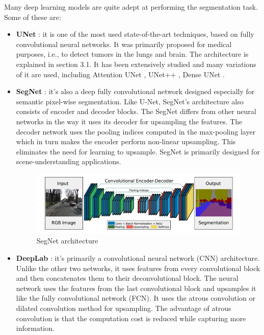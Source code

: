 Many deep learning models are quite adept at performing the segmentation task. Some of these are:
\begin{itemize}
    \item \textbf{UNet} \cite{ronneberger2015u}: it is one of the most used state-of-the-art techniques, based on fully convolutional neural networks. It was primarily proposed for medical purposes, i.e., to detect tumors in the lungs and brain. The architecture is explained in section 3.1. It has been extensively studied and many variations of it are used, including Attention UNet \cite{oktay2018attention}, UNet++ \cite{zhou2018unet++}, Dense UNet \cite{cai2020dense}.
    \item \textbf{SegNet} \cite{badrinarayanan2017segnet}: it's also a deep fully convolutional network designed especially for semantic pixel-wise segmentation. Like U-Net, SegNet’s architecture also consists of encoder and decoder blocks. The SegNet differs from other neural networks in the way it uses its decoder for upsampling the features. The decoder network uses the pooling indices computed in the max-pooling layer which in turn makes the encoder perform non-linear upsampling. This eliminates the need for learning to upsample. SegNet is primarily designed for scene-understanding applications.

    \begin{figure}[h]
        \centering
        \includegraphics[scale=0.75]{images/segnet.png}
        \caption{SegNet architecture}
        \label{fig:segnet}
    \end{figure}
    
    \item \textbf{DeepLab} \cite{chen2018encoder}: it's primarily a convolutional neural network (CNN) architecture. Unlike the other two networks, it uses features from every convolutional block and then concatenates them to their deconvolutional block. The neural network uses the features from the last convolutional block and upsamples it like the fully convolutional network (FCN). It uses the atrous convolution or dilated convolution method for upsampling. The advantage of atrous convolution is that the computation cost is reduced while capturing more information.
\end{itemize}

